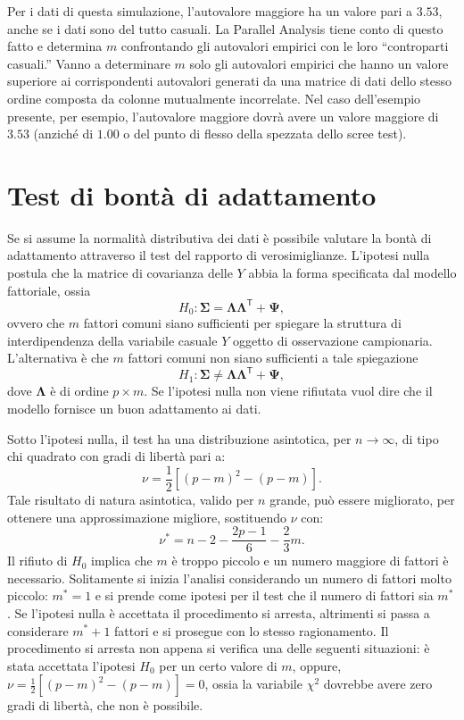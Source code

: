 Per i dati di questa simulazione, l'autovalore maggiore ha un valore
pari a $3.53$, anche se i dati sono del tutto casuali.
 La
Parallel Analysis tiene conto di questo fatto e determina $m$ confrontando  gli autovalori empirici con le loro ``controparti
casuali.'' 
 Vanno a determinare $m$ solo gli autovalori empirici che hanno
  un valore superiore ai corrispondenti autovalori generati da una
  matrice di dati dello stesso ordine composta da colonne mutualmente
  incorrelate.
 Nel caso dell'esempio presente, per esempio, l'autovalore maggiore dovrà
avere un valore maggiore di $3.53$ (anziché di $1.00$ o del punto di
flesso della spezzata dello scree test).



\section{Test di bontà di adattamento}

Se si assume la normalità   distributiva dei dati è possibile valutare la bontà di 
adattamento attraverso il test del rapporto di verosimiglianze. 
L'ipotesi nulla postula che la matrice di covarianza delle $Y$ abbia 
la forma specificata dal modello fattoriale, ossia 
$$
H_0: \boldsymbol{\Sigma} =  \boldsymbol{\Lambda}
  \boldsymbol{\Lambda}^{\ensuremath{\mathsf{T}}} +  \boldsymbol{\Psi},
$$
ovvero che $m$ fattori comuni siano sufficienti per spiegare 
la struttura di interdipendenza della variabile casuale $Y$ oggetto di 
osservazione campionaria. 
L'alternativa è che $m$ fattori comuni non siano sufficienti a tale spiegazione
$$
H_1: \boldsymbol{\Sigma} \neq  \boldsymbol{\Lambda}
  \boldsymbol{\Lambda}^{\ensuremath{\mathsf{T}}} +  \boldsymbol{\Psi},
$$
dove $\boldsymbol{\Lambda}$ è di ordine $p \times m$. 
Se l'ipotesi nulla non viene rifiutata vuol dire che il modello
fornisce un buon adattamento ai dati. 

Sotto l'ipotesi nulla, il test ha una distribuzione asintotica, per $n \rightarrow \infty$, di tipo chi quadrato con  gradi di libertà pari a: 
\begin{equation}
\nu=\frac{1}{2}\left[ (p-m)^2 - (p - m) \right].
\end{equation}
Tale risultato di natura asintotica, valido per $n$ grande, può essere migliorato, per 
ottenere una approssimazione migliore, sostituendo $\nu$ con: 
\begin{equation}
\nu^* = n - 2 - \frac{2p-1}{6}-\frac{2}{3}m.
\end{equation}
 Il rifiuto di $H_0$
implica che $m$ è troppo piccolo e un numero maggiore di fattori è
necessario. 
Solitamente si   inizia l'analisi considerando un numero di fattori molto piccolo: $m^*=1$ e si prende come 
ipotesi per il  test che il numero di fattori sia $m^*$.
  Se l'ipotesi
nulla è accettata il procedimento si arresta, altrimenti si passa a
considerare $m^* + 1$ fattori e si prosegue con lo stesso
ragionamento. 
 Il procedimento si arresta non appena si verifica una delle seguenti situazioni:
 è stata accettata l'ipotesi $H_0$ per un certo valore di $m$, oppure, 
 $\nu=\frac{1}{2}\left[ (p-m)^2 - (p - m) \right]=0$, 
ossia la variabile $\chi^2$ dovrebbe avere zero gradi di libertà, che
non è possibile. 

